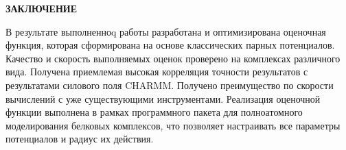 \newpage
\begin{center}
  \textbf{\large ЗАКЛЮЧЕНИЕ}
\end{center}


В результате выполненноq работы разработана и оптимизирована оценочная функция, которая сформирована на основе классических парных потенциалов. Качество и скорость выполняемых оценок проверено на комплексах различного вида. Получена приемлемая высокая корреляция точности результатов с результатами силового поля CHARMM. Получено преимущество по скорости вычислений с уже существующими инструментами. Реализация оценочной функции выполнена в рамках программного пакета для полноатомного моделирования белковых комплексов, что позволяет настраивать все параметры потенциалов и радиус их действия.